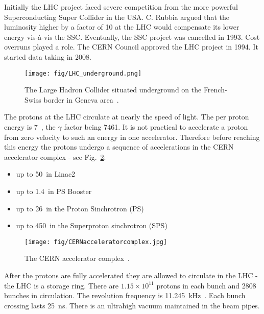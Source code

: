 Initially the LHC project faced severe competition from the more powerful Superconducting Super Collider in the USA. C. Rubbia argued that the luminosity higher by a factor of 10 at the LHC would compensate its lower energy vis-à-vis the SSC. Eventually, the SSC project was cancelled in 1993. Cost overruns played a role. The CERN Council approved the LHC project in 1994. It started data taking in 2008.

\begin{figure}[htpb]
  \centering
  \texttt{[image: fig/LHC\_underground.png]}
  \caption{The Large Hadron Collider situated underground on the French-Swiss border in Geneva area~\cite{cds:LHCunderground}.}
  \label{fig:LHC_underground}
\end{figure}

The protons at the LHC circulate at nearly the speed of light. The per proton energy is 7~\TeV, the $\gamma$ factor being 7461. It is not practical to accelerate a proton from zero velocity to such an energy in one accelerator. Therefore before reaching this energy the protons undergo a sequence of accelerations in the CERN accelerator complex - see Fig.~\ref{fig:CERN_accelerator_complex}:

\begin{itemize}
\item up to 50~\MeV in Linac2
\item up to 1.4~\GeV in PS Booster
\item up to 26~\GeV in the Proton Sinchrotron (PS)
\item up to 450~\GeV in the Superproton sinchrotron (SPS)
\end{itemize}

\begin{figure}[htpb]
  \centering
  \texttt{[image: fig/CERNacceleratorcomplex.jpg]}
  \caption{The CERN accelerator complex~\cite{espace:CERNacceleratorcomplex}.}
  \label{fig:CERN_accelerator_complex}
\end{figure}

After the protons are fully accelerated they are allowed to circulate in the LHC - the LHC is a storage ring. There are $1.15\times10^{11}$ protons in each bunch and 2808 bunches in circulation. The revolution frequency is 11.245~kHz~\cite{Bruning:2004ej}. Each bunch crossing lasts 25~ns. There is an ultrahigh vacuum maintained in the beam pipes.

